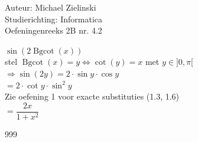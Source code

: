 \documentclass[a4paper]{article}
\newcommand{\Bgcot}{\operatorname{Bgcot}}
\begin{document}
\noindent \large Auteur: Michael Zielinski \\
\noindent \large Studierichting: Informatica\\
\noindent \large Oefeningenreeks 2B nr. 4.2\\

\medskip

\normalsize

$\sin(2\Bgcot(x))$ \\

stel $\Bgcot(x) = y \Leftrightarrow \cot(y) = x$ met $y \in ]0,\pi[$ \\

$\Rightarrow \sin(2y) = 2 \cdot \sin y \cdot \cos y$ \\

$ = 2 \cdot \cot y \cdot \sin^2 y$ \\

Zie oefening 1 voor exacte substituties (1.3, 1.6) \\

$ = \dfrac{2x}{1 + x^2}$ \\

\begin{thebibliography}{999}

\end{thebibliography}
\end{document}
